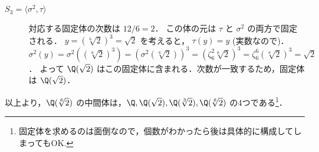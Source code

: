 \documentclass[a4paper,11pt]{ltjsarticle}
\begin{document}
\begin{itemize}
\begin{description}
    \item[$S_3=\langle \sigma^2, \tau \rangle$] 対応する固定体の次数は $12/6=2$．
    この体の元は $\tau$ と $\sigma^2$ の両方で固定される．
    $y = (\sqrt[6]{2})^3 = \sqrt{2}$ を考えると，
    $\tau(y) = y$ (実数なので)．
    $\sigma^2(y) = \sigma^2((\sqrt[6]{2})^3) = (\sigma^2(\sqrt[6]{2}))^3 = (\zeta_6^2 \sqrt[6]{2})^3 = \zeta_6^6 (\sqrt[6]{2})^3 = \sqrt{2}$．
    よって $\Q(\sqrt{2})$ はこの固定体に含まれる．次数が一致するため，固定体は $\Q(\sqrt{2})$．
\end{description}
\end{itemize}
以上より，$\Q(\sqrt[6]{2})$ の中間体は，$\Q, \Q(\sqrt{2}), \Q(\sqrt[3]{2}), \Q(\sqrt[6]{2})$ の4つである\footnote{固定体を求めるのは面倒なので，個数がわかったら後は具体的に構成してしまってもOK.}．
\end{document}
